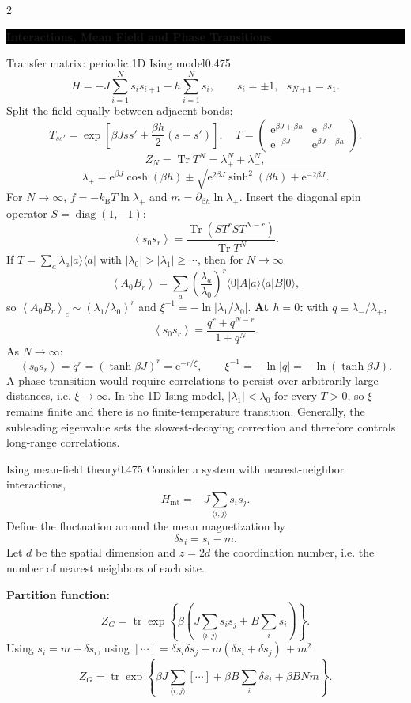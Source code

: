 \documentclass[8pt,a4paper]{extarticle}
\newcommand{\sectionbanner}[1]{%
  \par
  \Needspace{8\baselineskip}%
  \vspace{0.4ex}%
  \noindent
  \colorbox{black}{%
    \parbox{\dimexpr\linewidth-2\fboxsep\relax}{%
      \centering\color{white}\bfseries\footnotesize #1%
    }%
  }%
  \par\vspace{0.3ex}%
  \nopagebreak
}
\newcommand{\avg}[1]{\left\langle #1\right\rangle}
\newcommand{\Tr}{\operatorname{Tr}}
\newcommand{\e}{\mathrm e}
\newcommand{\kb}{k_{\mathrm B}}
\begin{document}
\begin{multicols*}{2}
\sectionbanner{Interactions, Mean Field and Phase Transitions}
\begin{mytikzbox}{Transfer matrix: periodic 1D Ising model}{0.475}
\[
H=-J\sum_{i=1}^Ns_is_{i+1}-h\sum_{i=1}^Ns_i,
\qquad s_i=\pm1,\text{ }s_{N+1}=s_1.
\]
Split the field equally between adjacent bonds:
\[
T_{ss'}=\exp\!\left[\beta Jss'+\frac{\beta h}{2}(s+s')\right],
\quad
T=\begin{pmatrix}
\e^{\beta J+\beta h}&\e^{-\beta J}\\
\e^{-\beta J}&\e^{\beta J-\beta h}
\end{pmatrix}.
\]
\[
Z_N=\Tr T^N=\lambda_+^N+\lambda_-^N,
\]
\[
\lambda_\pm=\e^{\beta J}\cosh(\beta h)
\pm\sqrt{\e^{2\beta J}\sinh^2(\beta h)+\e^{-2\beta J}}.
\]
For $N\to\infty$, $f=-\kb T\ln\lambda_+$ and
$m=\partial_{\beta h}\ln\lambda_+$. Insert the diagonal spin operator
$S=\operatorname{diag}(1,-1)$:
\[
\avg{s_0s_r}=\frac{\Tr(S T^r S T^{N-r})}{\Tr T^N}.
\]
If $T=\sum_a\lambda_a|a\rangle\langle a|$ with $|\lambda_0|>|\lambda_1|\ge\cdots$,
then for $N\to\infty$
\[
\avg{A_0B_r}
=\sum_a\left(\frac{\lambda_a}{\lambda_0}\right)^r
\langle0|A|a\rangle\langle a|B|0\rangle,
\]
so $\avg{A_0B_r}_c\sim(\lambda_1/\lambda_0)^r$ and
$\xi^{-1}=-\ln|\lambda_1/\lambda_0|$.
\textbf{At $h=0$:} with $q\equiv\lambda_-/\lambda_+$,
\[
\avg{s_0s_r}=\frac{q^r+q^{N-r}}{1+q^N}.
\]
As $N\to\infty$:
\[
\avg{s_0s_r}=q^r=(\tanh\beta J)^r=\e^{-r/\xi},
\qquad \xi^{-1}=-\ln|q|=-\ln(\tanh\beta J).
\]
A phase transition would require correlations to persist over arbitrarily large distances, i.e. $\xi\to\infty$. In the 1D Ising model, $|\lambda_1|<\lambda_0$ for every $T>0$, so $\xi$ remains finite and there is no finite-temperature transition. Generally, the subleading eigenvalue sets the slowest-decaying correction and therefore controls long-range correlations.
\end{mytikzbox}

\begin{mytikzbox}{Ising mean-field theory}{0.475}
Consider a system with nearest-neighbor interactions, \[ H_{\mathrm{int}}=-J\sum_{\langle i,j\rangle}s_i s_j. \] Define the fluctuation around the mean magnetization by \[ \delta s_i=s_i-m. \] Let \(d\) be the spatial dimension and \(z=2d\) the coordination number, i.e. the number of nearest neighbors of each site. 

\textbf{Partition function:} \[ Z_G=\operatorname{tr}\exp\left\{ \beta\left( J\sum_{\langle i,j\rangle}s_i s_j +B\sum_i s_i \right) \right\}. \] Using \(s_i=m+\delta s_i\), using $[\cdots] = \delta s_i\delta s_j +m(\delta s_i+\delta s_j)\, +m^2$\[ Z_G= \operatorname{tr}\exp\left\{ \beta J\sum_{\langle i,j\rangle} \left[ \cdots \right] +\beta B\sum_i\delta s_i +\beta BNm \right\}. \] 


\end{mytikzbox}
\end{multicols*}
\end{document}
